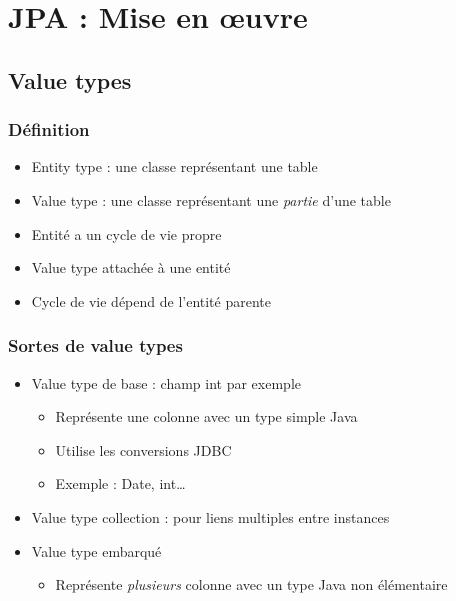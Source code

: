 \documentclass[english, french]{beamer}
\begin{document}
\section{JPA : Mise en œuvre}
\subsection{Value types}
\begin{frame}
	\frametitle{Définition}
	\begin{itemize}
		\item Entity type : une classe représentant une table
		\item Value type : une classe représentant une \emph{partie} d’une table
		\item Entité a un cycle de vie propre
		\item Value type attachée à une entité
		\item Cycle de vie dépend de l’entité parente
	\end{itemize}
\end{frame}

\begin{frame}
	\frametitle{Sortes de value types}
	\begin{itemize}
		\item Value type de base : champ int par exemple
		\begin{itemize}
			\item Représente une colonne avec un type simple Java
			\item Utilise les conversions JDBC
			\item Exemple : Date, int…
		\end{itemize}
		\item Value type collection : pour liens multiples entre instances
		\item Value type embarqué
		\begin{itemize}
			\item Représente \emph{plusieurs} colonne avec un type Java non élémentaire
		\end{itemize}
	\end{itemize}
\end{frame}
\end{document}
